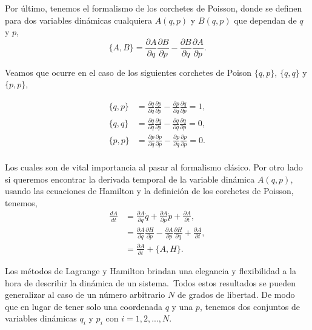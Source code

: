  Por último, tenemos el formalismo de los corchetes de Poisson, donde se definen para dos variables dinámicas cualquiera $A(q,p)$ y $B(q,p)$ que dependan de $q$ y $p$,
\begin{equation*}
    \lbrace A,B \rbrace=\frac{\partial A}{\partial q}\frac{\partial B}{\partial p}-\frac{\partial B}{\partial q}\frac{\partial A}{\partial p}.
\end{equation*}

Veamos que ocurre en el caso de los siguientes corchetes de Poison $\lbrace q,p \rbrace$, $\lbrace q,q \rbrace$ y $\lbrace p,p \rbrace$,

\begin{equation*}
    \begin{split}
        \lbrace q,p \rbrace&=\frac{\partial q}{\partial q}\frac{\partial p}{\partial p}-\frac{\partial p}{\partial q}\frac{\partial q}{\partial p}=1,\\
        \lbrace q,q \rbrace&=\frac{\partial q}{\partial q}\frac{\partial q}{\partial p}-\frac{\partial q}{\partial q}\frac{\partial q}{\partial p}=0,\\
        \lbrace p,p \rbrace&=\frac{\partial p}{\partial q}\frac{\partial p}{\partial p}-\frac{\partial p}{\partial q}\frac{\partial p}{\partial p}=0.\\
    \end{split}
\end{equation*} 

Los cuales son de vital importancia al pasar al formalismo clásico. Por otro lado si queremos encontrar la derivada temporal de la variable dinámica $A(q,p)$, usando las ecuaciones de Hamilton y la definición de los corchetes de Poisson, tenemos,
\begin{equation*}
    \begin{split}
        \frac{dA}{dt}&=\frac{\partial A}{\partial q}\dot{q}+\frac{\partial A}{\partial p}\dot{p}+\frac{\partial A}{\partial t},\\
        &=\frac{\partial A}{\partial q}\frac{\partial H}{\partial p}-\frac{\partial A}{\partial p}\frac{\partial H}{\partial q}+\frac{\partial A}{\partial t},\\
        &=\frac{\partial A}{\partial t}+\lbrace A,H \rbrace.
    \end{split}
\end{equation*} 
 
Los métodos de Lagrange y Hamilton brindan una elegancia y flexibilidad a la hora de describir la dinámica de un sistema.\
Todos estos resultados se pueden generalizar al caso de un número arbitrario $N$ de grados de libertad. De modo que en lugar de tener solo una coordenada $q$ y una $p$, tenemos dos conjuntos de variables dinámicas $q_{i}$ y $p_{i}$ con $i=1,2,...,N$.\

